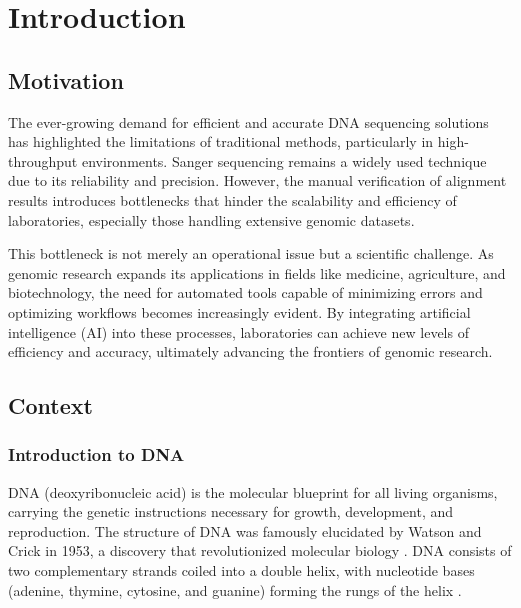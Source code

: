 
%

\chapter{Introduction}
\label{cha:introduction}



\section{Motivation}
\label{sec:Motivation}

The ever-growing demand for efficient and accurate DNA sequencing solutions has highlighted the limitations of traditional methods, particularly in high-throughput environments. Sanger sequencing remains a widely used technique due to its reliability and precision. However, the manual verification of alignment results introduces bottlenecks that hinder the scalability and efficiency of laboratories, especially those handling extensive genomic datasets.

This bottleneck is not merely an operational issue but a scientific challenge. As genomic research expands its applications in fields like medicine, agriculture, and biotechnology, the need for automated tools capable of minimizing errors and optimizing workflows becomes increasingly evident. By integrating artificial intelligence (AI) into these processes, laboratories can achieve new levels of efficiency and accuracy, ultimately advancing the frontiers of genomic research.

\section{Context}
\label{sec:Context}

\subsection{Introduction to DNA}
DNA (deoxyribonucleic acid) is the molecular blueprint for all living organisms, carrying the genetic instructions necessary for growth, development, and reproduction. The structure of DNA was famously elucidated by Watson and Crick in 1953, a discovery that revolutionized molecular biology \cite{watson_crick_dna}. DNA consists of two complementary strands coiled into a double helix, with nucleotide bases (adenine, thymine, cytosine, and guanine) forming the rungs of the helix \cite{khan_dna_structure}.

